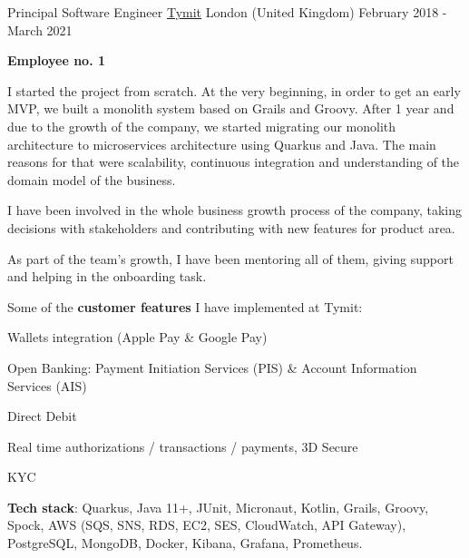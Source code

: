 \begin{cventries}
  \cventry
    {Principal Software Engineer} %
    {\href{https://tymit.com}{Tymit}} %
    {London (United Kingdom)} %
    {February 2018 - March 2021} %
    {
      \begin{cvitems}%
        \item[]\textbf{Employee no. 1}
        \item[]
        \item[] I started the project from scratch. At the very beginning, in order to get an early MVP, we built a monolith system based on Grails and Groovy. After 1 year and due to the growth of the company, we started migrating our monolith architecture to microservices architecture using Quarkus and Java. The main reasons for that were scalability, continuous integration and understanding of the domain model of the business.
        \item[]
        \item[] I have been involved in the whole business growth process of the company, taking decisions with stakeholders and contributing with new features for product area.
        \item[] 
        \item[] As part of the team's growth, I have been mentoring all of them, giving support and helping in the onboarding task.
        \item[]
        \item[] Some of the \textbf{customer features} I have implemented at Tymit: 
        \item[]
        \item {Wallets integration (Apple Pay \& Google Pay) }
        \item {Open Banking: Payment Initiation Services (PIS) \& Account Information Services (AIS) }
        \item {Direct Debit}
        \item {Real time authorizations / transactions / payments, 3D Secure}
        \item {KYC}
        \item[]
        \item[]\textbf{Tech stack}: Quarkus, Java 11+, JUnit, Micronaut, Kotlin, Grails, Groovy, Spock, AWS (SQS, SNS, RDS, EC2, SES, CloudWatch, API Gateway), PostgreSQL, MongoDB, Docker, Kibana, Grafana, Prometheus.
      \end{cvitems}
    }



\end{cventries}
